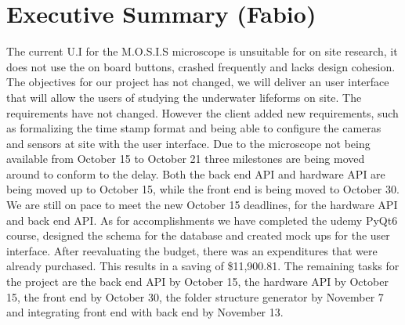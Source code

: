 \section*{Executive Summary (Fabio)}
\begin{spacing}{1.5}

The current U.I for the M.O.S.I.S microscope is unsuitable for on site research, it does not use the on board buttons, crashed frequently and lacks design cohesion. The objectives for our project has not changed, we will deliver an user interface that will allow the users of studying the underwater lifeforms on site. The requirements have not changed. However the client added new requirements, such as formalizing the time stamp format and being able to configure the cameras and sensors at site with the user interface. Due to the microscope not being available from October 15 to October 21  three milestones are being moved around to conform to the delay. Both the back end API and hardware API are being moved up to October 15, while the front end is being moved to October 30. We are still on pace to meet the new October 15 deadlines, for the hardware API and back end API. As for accomplishments we have completed the udemy PyQt6 course, designed the schema for the database and created mock ups for the user interface. After reevaluating the budget, there was an expenditures that were already purchased. This results in a saving of \$11,900.81. The remaining tasks for the project are the back end API by October 15, the hardware API by October 15, the front end by October 30, the folder structure generator by November 7 and integrating front end with back end by November 13.
    
\end{spacing}
\newpage